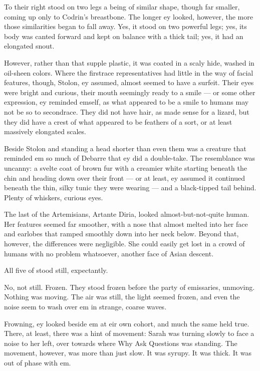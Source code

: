 To their right stood on two legs a being of similar shape, though far smaller, coming up only to Codrin's breastbone. The longer ey looked, however, the more those similarities began to fall away. Yes, it stood on two powerful legs; yes, its body was canted forward and kept on balance with a thick tail; yes, it had an elongated snout.

However, rather than that supple plastic, it was coated in a scaly hide, washed in oil-sheen colors. Where the firstrace representatives had little in the way of facial features, though, Stolon, ey assumed, almost seemed to have a surfeit. Their eyes were bright and curious, their mouth seemingly ready to a smile — or some other expression, ey reminded emself, as what appeared to be a smile to humans may not be so to secondrace. They did not have hair, as made sense for a lizard, but they did have a crest of what appeared to be feathers of a sort, or at least massively elongated scales.

Beside Stolon and standing a head shorter than even them was a creature that reminded em so much of Debarre that ey did a double-take. The resemblance was uncanny: a svelte coat of brown fur with a creamier white starting beneath the chin and heading down over their front — or at least, ey assumed it continued beneath the thin, silky tunic they were wearing — and a black-tipped tail behind. Plenty of whiskers, curious eyes.

The last of the Artemisians, Artante Diria, looked almost-but-not-quite human. Her features seemed far smoother, with a nose that almost melted into her face and earlobes that ramped smoothly down into her neck below. Beyond that, however, the differences were negligible. She could easily get lost in a crowd of humans with no problem whatsoever, another face of Asian descent.

All five of stood still, expectantly.

No, not still. Frozen. They stood frozen before the party of emissaries, unmoving. Nothing was moving. The air was still, the light seemed frozen, and even the noise seem to wash over em in strange, coarse waves.

Frowning, ey looked beside em at eir own cohort, and much the same held true. There, at least, there was a hint of movement: Sarah was turning slowly to face a noise to her left, over towards where Why Ask Questions was standing. The movement, however, was more than just slow. It was syrupy. It was thick. It was out of phase with em.


